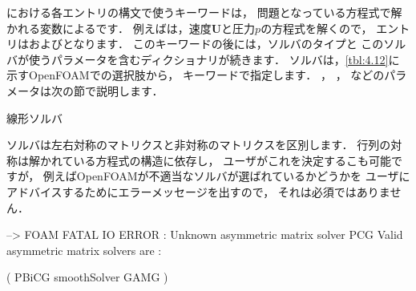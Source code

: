 における各エントリの構文で使うキーワードは，
問題となっている方程式で解かれる変数によるです．
例えばは，速度$\bm{U}$と圧力$p$の方程式を解くので，
エントリはおよびとなります．
このキーワードの後には，ソルバのタイプと
このソルバが使うパラメータを含むディクショナリが続きます．
ソルバは，\autoref{tbl:4.12}に示すOpenFOAMでの選択肢から，
キーワードで指定します．
%
%
，
%
%
，
%
%
などのパラメータは次の節で説明します．


\begin{table}[ht]
 
 \caption{線形ソルバ}
 \label{tbl:4.12}
\end{table}


ソルバは左右対称のマトリクスと非対称のマトリクスを区別します．
行列の対称は解かれている方程式の構造に依存し，
ユーザがこれを決定するこも可能ですが，
例えばOpenFOAMが不適当なソルバが選ばれているかどうかを
ユーザにアドバイスするためにエラーメッセージを出すので，
それは必須ではありません．
\begin{OFverbatim}[terminal]
--> FOAM FATAL IO ERROR : Unknown asymmetric matrix solver PCG
Valid asymmetric matrix solvers are :

(
PBiCG
smoothSolver
GAMG
)
\end{OFverbatim}

